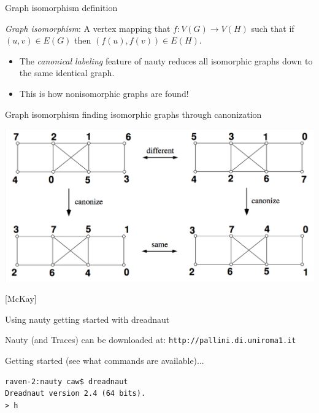\documentclass{beamer}
\begin{document}

\begin{frame}{Graph isomorphism}
{definition}

\emph{Graph isomorphism}: A vertex mapping that $f : V(G) \to V(H)$ such that if $(u,v) \in E(G)$ then $(f(u), f(v)) \in E(H)$.

\medskip
\begin{itemize}
\item
The \emph{canonical labeling} feature of nauty reduces all isomorphic graphs down to the same identical graph. 
\item
This is how nonisomorphic graphs are found!
\end{itemize}

\end{frame}


\begin{frame}{Graph isomorphism}
{finding isomorphic graphs through canonization}

\begin{center}
\includegraphics[scale=0.3]{canonical.png}
\end{center}
{\small [McKay]}

\end{frame}


\begin{frame}[fragile] {Using nauty}
{getting started with dreadnaut}

Nauty (and Traces) can be downloaded at:
{\tt http://pallini.di.uniroma1.it} 

\bigskip

Getting started (see what commands are available)... 

\bigskip

\begin{lstlisting}[frame=single]
raven-2:nauty caw$ dreadnaut
Dreadnaut version 2.4 (64 bits).
> h 
\end{lstlisting}

\end{frame}
\end{document}
